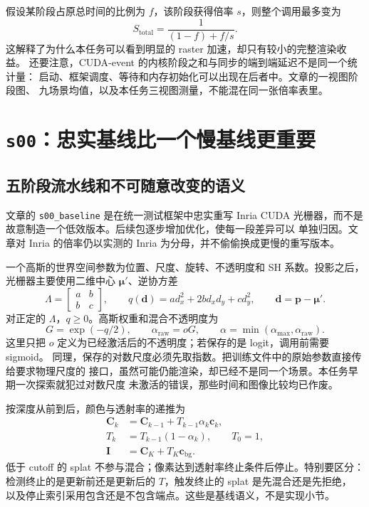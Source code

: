 假设某阶段占原总时间的比例为 $f$，该阶段获得倍率 $s$，则整个调用最多变为
\begin{equation}
 S_{\mathrm{total}}=\frac{1}{(1-f)+f/s}.
\end{equation}
这解释了为什么本任务可以看到明显的 raster 加速，却只有较小的完整渲染收益。
还要注意，CUDA-event 的内核阶段之和与同步的端到端延迟不是同一个统计量：
启动、框架调度、等待和内存初始化可以出现在后者中。文章的一视图阶段图、
九场景均值，以及本任务三视图测量，不能混在同一张倍率表里。

\section{\texttt{s00}：忠实基线比一个慢基线更重要}

\subsection{五阶段流水线和不可随意改变的语义}

文章的 \texttt{s00\_baseline} 是在统一测试框架中忠实重写 Inria CUDA
光栅器，而不是故意制造一个低效版本。后续包逐步增加优化，使每一段差异可以
单独归因。文章对 Inria 的倍率仍以实测的 Inria 为分母，并不偷偷换成更慢的重写版本。

一个高斯的世界空间参数为位置、尺度、旋转、不透明度和 SH 系数。投影之后，
光栅器主要使用二维中心 $\boldsymbol\mu'$、逆协方差
\begin{equation}
 \Lambda=\begin{bmatrix}a&b\\b&c\end{bmatrix},\qquad
 q(\boldsymbol d)=a d_x^2+2b d_xd_y+c d_y^2,
 \qquad \boldsymbol d=\boldsymbol p-\boldsymbol\mu'.
\end{equation}
对正定的 $\Lambda$，$q\geq0$。高斯权重和混合不透明度为
\begin{equation}
 G=\exp(-q/2),\qquad
 \alpha_{\mathrm{raw}}=oG,\qquad
 \alpha=\min(\alpha_{\max},\alpha_{\mathrm{raw}}).
\end{equation}
这里只把 $o$ 定义为已经激活后的不透明度；若保存的是 logit，调用前需要 sigmoid。
同理，保存的对数尺度必须先取指数。把训练文件中的原始参数直接传给要求物理尺度的
接口，虽然可能仍能渲染，却已经不是同一个场景。本任务早期一次探索就犯过对数尺度
未激活的错误，那些时间和图像比较均已作废。

按深度从前到后，颜色与透射率的递推为
\begin{align}
 \boldsymbol C_k&=\boldsymbol C_{k-1}
                  +T_{k-1}\alpha_k\boldsymbol c_k,\\
 T_k&=T_{k-1}(1-\alpha_k),\qquad T_0=1,\\
 \boldsymbol I&=\boldsymbol C_K+T_K\boldsymbol c_{\mathrm{bg}}.
\end{align}
低于 cutoff 的 splat 不参与混合；像素达到透射率终止条件后停止。特别要区分：
检测终止的是更新前还是更新后的 $T$，触发终止的 splat 是先混合还是先拒绝，
以及停止索引采用包含还是不包含端点。这些是基线语义，不是实现小节。

